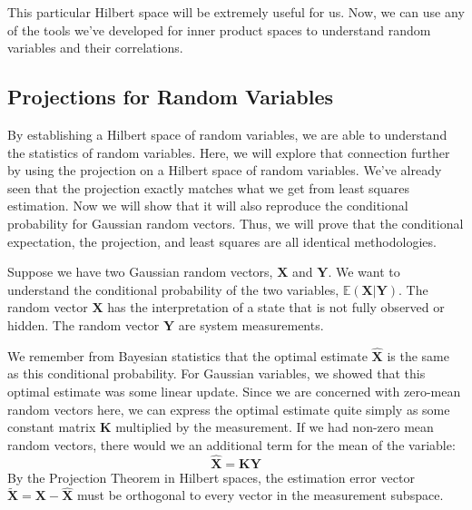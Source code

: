 This particular Hilbert space will be extremely useful for us. Now, we can use any of the tools we've developed for inner product spaces to understand random variables and their correlations.

\subsection{Projections for Random Variables}

By establishing a Hilbert space of random variables, we are able to understand the statistics of random variables. Here, we will explore that connection further by using the projection on a Hilbert space of random variables. We've already seen that the projection exactly matches what we get from least squares estimation. Now we will show that it will also reproduce the conditional probability for Gaussian random vectors. Thus, we will prove that the conditional expectation, the projection, and least squares are all identical methodologies.

Suppose we have two Gaussian random vectors, $\bm{X}$ and $\bm{Y}$. We want to understand the conditional probability of the two variables, $\mathbb{E}(\bm{X}|\bm{Y})$. The random vector $\bm{X}$ has the interpretation of a state that is not fully observed or hidden. The random vector $\bm{Y}$ are system measurements.

We remember from Bayesian statistics that the optimal estimate $\bm{\hat{X}}$ is the same as this conditional probability. For Gaussian variables, we showed that this optimal estimate was some linear update. Since we are concerned with zero-mean random vectors here, we can express the optimal estimate quite simply as some constant matrix $\bm{K}$ multiplied by the measurement. If we had non-zero mean random vectors, there would we an additional term for the mean of the variable:
\begin{equation}
\hat{\bm{X}} = \bm{K}\bm{Y}
\end{equation}
By the Projection Theorem in Hilbert spaces, the estimation error vector $\tilde{\bm{X}} = \bm{X} - \hat{\bm{X}}$ must be orthogonal to every vector in the measurement subspace. 

